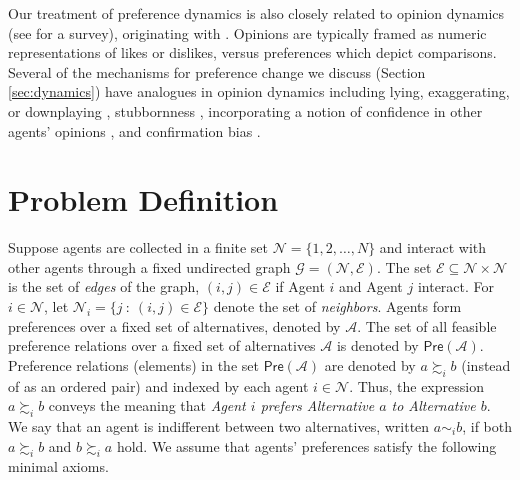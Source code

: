 \documentclass[conference]{ieeeconf}
\newcommand{\N}{\mathcal{N}}
\newcommand{\A}{\mathcal{A}}
\newcommand{\E}{\mathcal{E}}
\newcommand{\Pref}{\mathsf{Pre}}
\newcommand{\prefers}{\succsim}
\newcommand{\indif}{\sim}
\newcommand{\graph}{\mathcal{G}}
\begin{document}
Our treatment of preference dynamics is also closely related to opinion dynamics (see \cite{noorazar2020} for a survey), originating with \cite{degroot1974}. Opinions are typically framed as numeric representations of likes or dislikes, versus preferences which depict comparisons. Several of the mechanisms for preference change we discuss (Section \ref{sec:dynamics}) have analogues in opinion dynamics including lying, exaggerating, or downplaying \cite{hansen2021}, stubbornness \cite{ghaderi2014}, incorporating a notion of confidence in other agents' opinions \cite{hegselmann2002,blondel2009}, and confirmation bias \cite{hayhoe2017}.


\section{Problem Definition}
\label{sec:problem}
\vspace{-0.25em}
Suppose agents are collected in a finite set $\N = \{1,2,\dots,N\}$ and interact with other agents through a fixed undirected graph $\graph = (\N,\E)$. The set $\E \subseteq \N \times \N$ is the set of \emph{edges} of the graph, $(i,j) \in \E$ if Agent $i$ and Agent $j$ interact. For $i \in \N$, let $\N_i = \{ j~:~(i,j) \in \E\}$ denote the set of \emph{neighbors}. Agents form preferences over a fixed set of alternatives, denoted by $\A$.
The set of all feasible preference relations over a fixed set of alternatives $\A$ is denoted by $\Pref(\A)$. Preference relations (elements) in the set $\Pref(\A)$ are denoted by $a \prefers_i b$ (instead of as an ordered pair) and indexed by each agent $i \in \N$. Thus, the expression $a \prefers_i b$ conveys the meaning that \emph{Agent $i$ prefers Alternative $a$ to Alternative $b$}. We say that an agent is indifferent between two alternatives, written $a \indif_i b$, if both $a \prefers_i b$ and $b \prefers_i a$ hold. We assume that agents' preferences satisfy the following minimal axioms.



\end{document}
